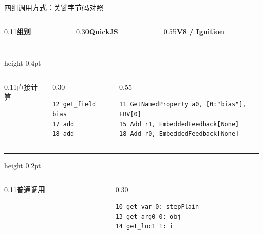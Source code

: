 \begin{frame}[fragile,t]{四组调用方式：关键字节码对照}
\begingroup
\setlength{\parskip}{0pt}
\fontsize{10}{11.5}\selectfont
\begin{columns}[T,onlytextwidth]
  \begin{column}{0.11\textwidth}\textbf{组别}\end{column}
  \begin{column}{0.30\textwidth}\textbf{QuickJS}\end{column}
  \begin{column}{0.55\textwidth}\textbf{V8 / Ignition}\end{column}
\end{columns}
\par\vspace{2pt}\hrule height 0.4pt\vspace{3pt}
\begin{columns}[T,onlytextwidth]
  \begin{column}{0.11\textwidth}直接计算\end{column}
  \begin{column}{0.30\textwidth}
\begin{lstlisting}
12 get_field bias
17 add
18 add
\end{lstlisting}
  \end{column}
  \begin{column}{0.55\textwidth}
\begin{lstlisting}
11 GetNamedProperty a0, [0:"bias"], FBV[0]
15 Add r1, EmbeddedFeedback[None]
18 Add r0, EmbeddedFeedback[None]
\end{lstlisting}
  \end{column}
\end{columns}
\par\vspace{3pt}\hrule height 0.2pt\vspace{3pt}
\begin{columns}[T,onlytextwidth]
  \begin{column}{0.11\textwidth}普通调用\end{column}
  \begin{column}{0.30\textwidth}
\begin{lstlisting}
10 get_var 0: stepPlain
13 get_arg0 0: obj
14 get_loc1 1: i

\end{lstlisting}
\end{column}
\end{columns}
\end{frame}
